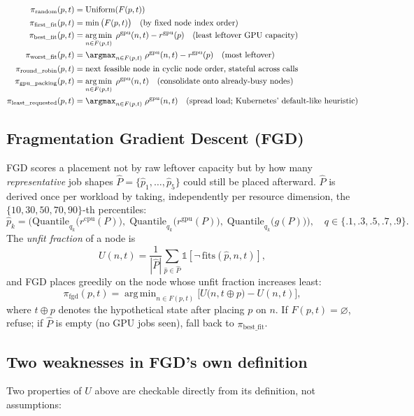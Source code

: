 \documentclass[11pt]{article}
\DeclareMathOperator*{\argmin}{arg\,min}
\begin{document}
\begin{align*}
  \pi_{\text{random}}(p,t) &= \text{Uniform}(F(p,t)) \\
  \pi_{\text{first\_fit}}(p,t) &= \min\big(F(p,t)\big) \quad\text{(by fixed node index order)} \\
  \pi_{\text{best\_fit}}(p,t) &= \argmin_{n \in F(p,t)} \; \rho^{\text{gpu}}(n,t) - r^{\text{gpu}}(p)
    \quad\text{(least leftover GPU capacity)} \\
  \pi_{\text{worst\_fit}}(p,t) &= \argmax_{n \in F(p,t)} \; \rho^{\text{gpu}}(n,t) - r^{\text{gpu}}(p)
    \quad\text{(most leftover)} \\
  \pi_{\text{round\_robin}}(p,t) &= \text{next feasible node in cyclic node order, stateful across calls} \\
  \pi_{\text{gpu\_packing}}(p,t) &= \argmin_{n \in F(p,t)} \; \rho^{\text{gpu}}(n,t)
    \quad\text{(consolidate onto already-busy nodes)} \\
  \pi_{\text{least\_requested}}(p,t) &= \argmax_{n \in F(p,t)} \; \rho^{\text{gpu}}(n,t)
    \quad\text{(spread load; Kubernetes' default-like heuristic)}
\end{align*}

\subsection{Fragmentation Gradient Descent (FGD)}
\label{sec:fgd}
FGD \cite{fgd} scores a placement not by raw leftover capacity but by how
many \emph{representative} job shapes $\hat P = \{\hat p_1, \dots, \hat
p_5\}$ could still be placed afterward. $\hat P$ is derived once per
workload by taking, independently per resource dimension, the
$\{10,30,50,70,90\}$-th percentiles:
\[
  \hat p_k = \Big(\text{Quantile}_{q_k}\big(r^{\text{cpu}}(P)\big),\;
                    \text{Quantile}_{q_k}\big(r^{\text{gpu}}(P)\big),\;
                    \text{Quantile}_{q_k}\big(g(P)\big)\Big), \quad q \in \{.1,.3,.5,.7,.9\}.
\]
The \emph{unfit fraction} of a node is
\[
  U(n,t) = \frac{1}{|\hat P|}\sum_{\hat p \in \hat P} \mathbb{1}[\neg\,\mathrm{fits}(\hat p, n, t)],
\]
and FGD places greedily on the node whose unfit fraction increases least:
\[
  \pi_{\text{fgd}}(p,t) = \argmin_{n \in F(p,t)} \Big[U\big(n, t \oplus p\big) - U(n,t)\Big],
\]
where $t \oplus p$ denotes the hypothetical state after placing $p$ on
$n$. If $F(p,t)=\varnothing$, refuse; if $\hat P$ is empty (no GPU jobs
seen), fall back to $\pi_{\text{best\_fit}}$.

\subsection{Two weaknesses in FGD's own definition}
\label{sec:fgd-weaknesses}
Two properties of $U$ above are checkable directly from its definition,
not assumptions:
\end{document}
